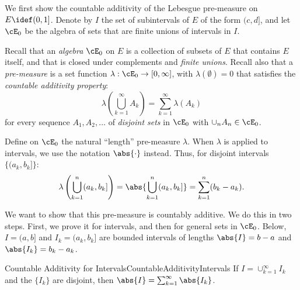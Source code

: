 We first show the countable additivity of the Lebesgue pre-measure on $E \idef (0, 1]$. Denote by $I$ the set of subintervals of $E$ of the form $(c, d]$, and let $\cE_0$ be the algebra of sets that are finite unions of intervals in $I$.

Recall that an \textit{algebra} $\cE_0$ on $E$ is a collection of subsets of $E$ that contains $E$ itself, and that is closed under complements and \textit{finite unions}. Recall also that a \textit{pre-measure} is a set function $\lambda : \cE_0 \to [0, \infty]$, with $\lambda(\emptyset) = 0$ that satisfies the \textit{countable additivity property}:
\begin{equation}
	\lambda\left(\bigcup_{k=1}^\infty A_k\right) = \sum_{k=1}^\infty \lambda(A_k)
	\label{eq:PreMeasureAdditivity}
\end{equation}
for every sequence $A_1, A_2, \dots$ of \textit{disjoint sets} in $\cE_0$ with $\cup_n A_n \in \cE_0$.

Define on $\cE_0$ the natural ``length'' pre-measure $\lambda$. When $\lambda$ is applied to intervals, we use the notation $\abs{\cdot}$ instead. Thus, for disjoint intervals $\{(a_k, b_k]\}$:
\begin{equation*}
	\lambda\left(\bigcup_{k=1}^n (a_k, b_k]\right) = \abs{\bigcup_{k=1}^n (a_k, b_k]} = \sum_{k=1}^n (b_k - a_k).
\end{equation*}

We want to show that this pre-measure is countably additive. We do this in two steps. First, we prove it for intervals, and then for general sets in $\cE_0$. Below, $I = (a, b]$ and $I_k = (a_k, b_k]$ are bounded intervals of lengths $\abs{I} = b - a$ and $\abs{I_k} = b_k - a_k$.

\begin{prop}{Countable Additivity for Intervals}{CountableAdditivityIntervals}
	If $I = \cup_{k=1}^\infty I_k$ and the $\{I_k\}$ are disjoint, then $\abs{I} = \sum_{k=1}^\infty \abs{I_k}$.
\end{prop}

